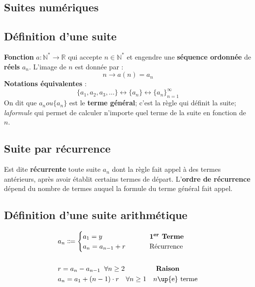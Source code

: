 \documentclass{report}
\begin{document}
\begin{multicols*}{3}
    \footnotesize

    \chapter{Suites numériques}
    \section{Définition d'une suite}
        \textbf{Fonction} $a \colon \mathbb{N}^* 
        \rightarrow \mathbb{R}$ qui accepte 
        $n \in \mathbb{N}^*$ et engendre une \textbf{séquence ordonnée} de 
        \textbf{réels} $a_n$. L'image de $n$ est donnée par :
        \[%
           n \rightarrow a(n) = a_n 
        \]%
        \textbf{Notations équivalentes} :    
        \[%
            \{a_1, a_2, a_3,\dots\} \leftrightarrow  \{ a_n \} 
                            \leftrightarrow  \{a_n\}_{ n = 1}^{\infty }
        \]%
        On dit que $a_n ou \{a_n\}$ est le \textbf{terme général}; c'est la 
        règle qui définit la suite; \textit{laformule}  qui permet de calculer 
        n'importe quel terme de la suite en fonction de $n$. 


    \section{Suite par récurrence}
    Est dite \textbf{récurrente} toute suite $a_n$ dont la 
    règle fait appel à des termes antérieurs, après avoir 
    établit certains termes de départ. L'\textbf{ordre de récurrence}
    dépend du nombre de termes auquel la formule du terme général 
    fait appel.

    \section{Définition d'une suite arithmétique}    

    \begin{align*}
        &a_n \Coloneqq 
        \begin{cases}
            a_1 = y & \hspace{2.5em} \textbf{1\textsuperscript{er} Terme}\\  
            a_{n} = a_{n-1} + r & \hspace{2.5em} \text{Récurrence}
        \end{cases}
        \\\\
        &r = a_n - a_{n-1} \;\; \forall n \geq 2  
        \quad\quad\quad\quad\;\;%
        \textbf{\hfill Raison}  
        \\
        &a_n = a_1 + \left(n - 1\right) \cdot r \quad \forall n \geq 1 
        \quad 
        \text{$n$\up{e} terme}
    \end{align*}



\end{multicols*}
\end{document}
